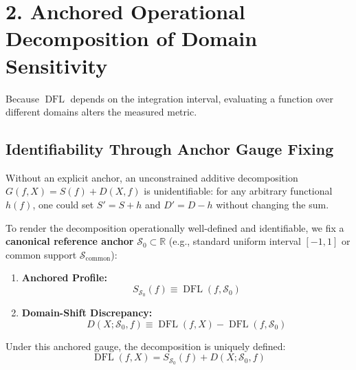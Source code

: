 \documentclass{article}
\begin{document}
\section*{2. Anchored Operational Decomposition of Domain Sensitivity}

Because $\operatorname{DFL}$ depends on the integration interval, evaluating a function over different domains alters the measured metric.

\subsection*{Identifiability Through Anchor Gauge Fixing}
Without an explicit anchor, an unconstrained additive decomposition $G(f, X) = S(f) + D(X, f)$ is unidentifiable: for any arbitrary functional $h(f)$, one could set $S' = S + h$ and $D' = D - h$ without changing the sum.

To render the decomposition operationally well-defined and identifiable, we fix a \textbf{canonical reference anchor} $\mathcal{S}_0 \subset \mathbb{R}$ (e.g., standard uniform interval $[-1, 1]$ or common support $\mathcal{S}_{\mathrm{common}}$):
\begin{enumerate}
    \item \textbf{Anchored Profile:}
    \begin{equation}
    S_{\mathcal{S}_0}(f) \equiv \operatorname{DFL}(f, \mathcal{S}_0)
    \end{equation}
    \item \textbf{Domain-Shift Discrepancy:}
    \begin{equation}
    D(X; \mathcal{S}_0, f) \equiv \operatorname{DFL}(f, X) - \operatorname{DFL}(f, \mathcal{S}_0)
    \end{equation}
\end{enumerate}
Under this anchored gauge, the decomposition is uniquely defined:
\begin{equation}
\operatorname{DFL}(f, X) = S_{\mathcal{S}_0}(f) + D(X; \mathcal{S}_0, f)
\end{equation}
\end{document}
